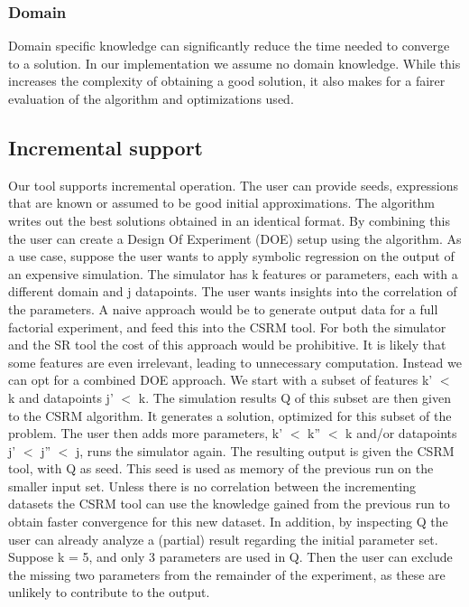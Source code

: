 \subsubsection{Domain}
Domain specific knowledge can significantly reduce the time needed to converge to a solution. In our implementation we assume no domain knowledge. While this increases the complexity of obtaining a good solution, it also makes for a fairer evaluation of the algorithm and optimizations used.

\subsection{Incremental support} %
Our tool supports incremental operation. The user can provide seeds, expressions that are known or assumed to be good initial approximations. The algorithm writes out the best solutions obtained in an identical format. By combining this the user can create a Design Of Experiment (DOE) setup using the algorithm. As a use case, suppose the user wants to apply symbolic regression on the output of an expensive simulation. The simulator has k features or parameters, each with a different domain and j datapoints. The user wants insights into the correlation of the parameters. 
A naive approach would be to generate output data for a full factorial experiment, and feed this into the CSRM tool. For both the simulator and the SR tool the cost of this approach would be prohibitive. It is likely that some features are even irrelevant, leading to unnecessary computation. Instead we can opt for a combined DOE approach. We start with a subset of features k' $<$ k and datapoints j' $<$ k. The simulation results Q of this subset are then given to the CSRM algorithm. It generates a solution, optimized for this subset of the problem. 
The user then adds more parameters, k' $<$ k'' $<$ k and/or datapoints j' $<$ j'' $<$ j, runs the simulator again. The resulting output is given the CSRM tool, with Q as seed. This seed is used as memory of the previous run on the smaller input set. Unless there is no correlation between the incrementing datasets the CSRM tool can use the knowledge gained from the previous run to obtain faster convergence for this new dataset. In addition, by inspecting Q the user can already analyze a (partial) result regarding the initial parameter set. Suppose k = 5, and only 3 parameters are used in Q. Then the user can exclude the missing two parameters from the remainder of the experiment, as these are unlikely to contribute to the output.
